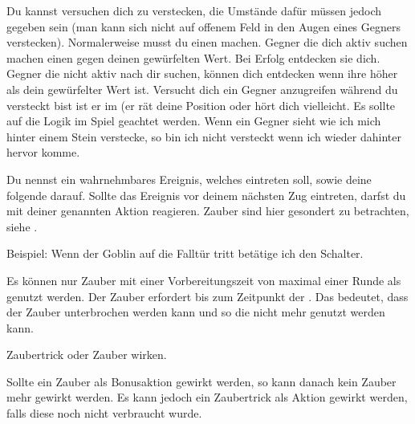 Du kannst versuchen dich zu verstecken, die Umstände dafür müssen jedoch gegeben sein (man kann sich nicht auf offenem Feld in den Augen eines Gegners verstecken). Normalerweise musst du einen  machen. Gegner die dich aktiv suchen machen einen  gegen deinen gewürfelten Wert. Bei Erfolg entdecken sie dich. Gegner die nicht aktiv nach dir suchen, können dich entdecken wenn ihre  höher als dein gewürfelter Wert ist. Versucht dich ein Gegner anzugreifen während du versteckt bist ist er im  (er rät deine Position oder hört dich vielleicht. Es sollte auf die Logik im Spiel geachtet werden. Wenn ein Gegner sieht wie ich mich hinter einem Stein verstecke, so bin ich nicht versteckt wenn ich wieder dahinter hervor komme.



Du nennst ein wahrnehmbares Ereignis, welches eintreten soll, sowie deine folgende  darauf. Sollte das Ereignis vor deinem nächsten Zug eintreten, darfst du mit deiner genannten Aktion reagieren. Zauber sind hier gesondert zu betrachten, siehe .

Beispiel: Wenn der Goblin auf die Falltür tritt betätige ich den Schalter.



Es können nur Zauber mit einer Vorbereitungszeit von maximal einer Runde als  genutzt werden. Der Zauber erfordert bis zum Zeitpunkt der  . Das bedeutet, dass der Zauber unterbrochen werden kann und so die  nicht mehr genutzt werden kann.



Zaubertrick oder Zauber wirken.

Sollte ein Zauber als Bonusaktion gewirkt werden, so kann danach kein Zauber mehr gewirkt werden. Es kann jedoch ein Zaubertrick als Aktion gewirkt werden, falls diese noch nicht verbraucht wurde.